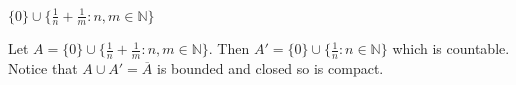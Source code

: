 \begin{Exercise}
	\begin{answer}
		$\{0\}\cup \{\frac{1}{n} + \frac{1}{m}:n,m\in\mathbb{N}\}$ 
	\end{answer}
	\begin{solution}
		Let $A = \{0\}\cup \{\frac{1}{n} + \frac{1}{m}:n,m\in\mathbb{N}\}$.
		Then $A' = \{0\}\cup \{\frac{1}{n}:n\in\mathbb{N}\}$ which is countable.
		Notice that $A\cup A' = \overline{A}$ is bounded and closed so is compact.
		
	\end{solution}
\end{Exercise}